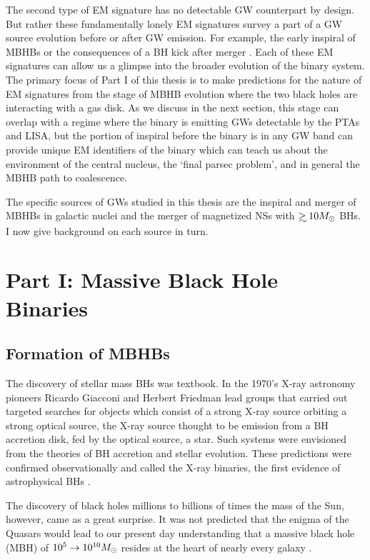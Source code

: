 The second type of EM signature has no detectable GW counterpart by design.
But rather these fundamentally lonely EM signatures survey a part of a GW
source evolution before or after GW emission. For example, the early inspiral
of MBHBs \citep[\emph{e.g.}][]{Haiman+2008, HKM09} or the consequences of a BH
kick after merger \citep[\emph{e.g.}][]{Rosotti:2012}. Each of these EM
signatures can allow us a glimpse into the broader evolution of the binary
system. The primary focus of Part I of this thesis is to make predictions for
the nature of EM signatures from the stage of MBHB evolution where the two
black holes are interacting with a gas disk. As we discuss in the next
section, this stage can overlap with a regime where the binary is emitting GWs
detectable by the PTAs and LISA, but the portion of inspiral before the binary
is in any GW band can provide unique EM identifiers of the binary which can
teach us about the environment of the central nucleus, the `final parsec
problem', and in general the MBHB path to coalescence.

The specific sources of GWs studied in this thesis are the inspiral and merger
of MBHBs in galactic nuclei and the merger of magnetized NSs with $\gsim 10
\Msun$ BHs. I now give background on each source in turn.






\section{Part I: Massive Black Hole Binaries} 
\subsection{Formation of MBHBs}     

The discovery of stellar mass BHs was textbook. In
the 1970's X-ray astronomy pioneers Ricardo Giacconi and Herbert Friedman lead
groups that carried out targeted searches for objects which consist of a
strong X-ray source orbiting a strong optical source, the X-ray source
thought to be emission from a BH accretion disk, fed by the optical source, a
star. Such systems were envisioned from the theories of BH accretion and
stellar evolution. These predictions were confirmed observationally and called
the X-ray binaries, the first evidence of astrophysical BHs 
\citep[an entertaining historical account is found in][]{ThorneBHsTimeWarps:CH8}. 

The discovery of black holes millions to billions of times the mass of the
Sun, however, came as a great surprise. It was not predicted that the enigma
of the Quasars \citep[\emph{e.g.}][]{Schmidt:1963, Salpeter:1964,
LyndenBell:1969} would lead to our present day understanding that a massive
black hole (MBH) of $10^5 \rightarrow 10^{10} {M_{\odot}}$ resides at the heart of
nearly every galaxy \citep{kr95, KormendyHo2013, ff05}.

